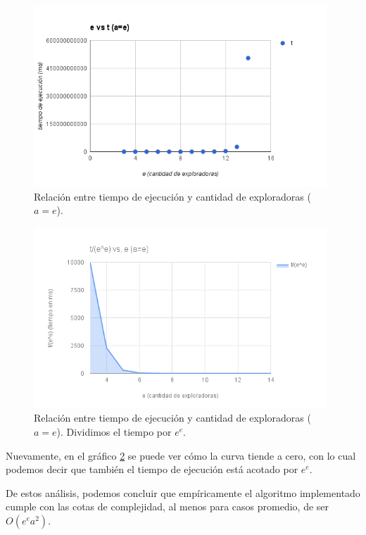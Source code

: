  \begin{figure}[h!]
   \begin{center}
 	\includegraphics[width=11cm]{imagenes/ej3/EA-t.png}
	\caption{Relación entre tiempo de ejecución y cantidad de exploradoras ($a=e$).}
	\label{EAt}
   \end{center}
 \end{figure}
 
 \begin{figure}[h!]
   \begin{center}
 	\includegraphics[width=11cm]{imagenes/ej3/EA-tdividido.png}
	\caption{Relación entre tiempo de ejecución y cantidad de exploradoras ($a=e$). Dividimos el tiempo por $e^e$.}
	\label{EAtdividido}
   \end{center}
 \end{figure}
 
 Nuevamente, en el gráfico \ref{EAtdividido} se puede ver cómo la curva tiende a cero, con lo cual podemos decir que también el tiempo de ejecución está acotado por $e^e$.
 
 De estos análisis, podemos concluir que empíricamente el algoritmo implementado cumple con las cotas de complejidad, al menos para casos promedio, de ser $O(e^e a^2)$.